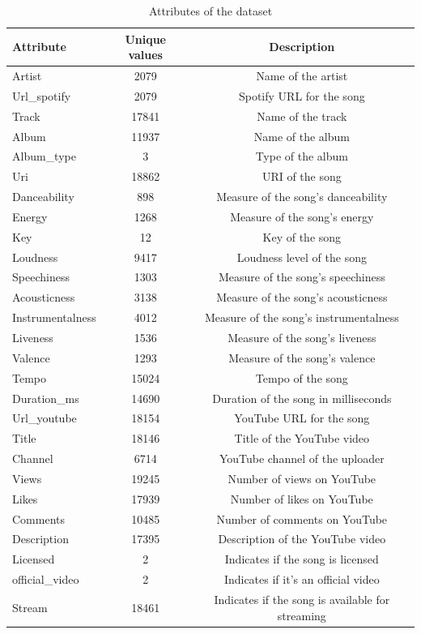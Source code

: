 \documentclass[11pt]{article} %
\begin{document}
\begin{table}[H]
	\centering
	\begin{tabular}{lcc}
		\toprule
		\textbf{Attribute} & \textbf{Unique values} & \textbf{Description} \\
		\midrule
		Artist & 2079 & Name of the artist \\
		Url\_spotify & 2079 & Spotify URL for the song \\
		Track & 17841 & Name of the track \\
		Album & 11937 & Name of the album \\
		Album\_type & 3 & Type of the album \\
		Uri & 18862 & URI of the song \\
		Danceability & 898 & Measure of the song's danceability \\
		Energy & 1268 & Measure of the song's energy \\
		Key & 12 & Key of the song \\
		Loudness & 9417 & Loudness level of the song \\
		Speechiness & 1303 & Measure of the song's speechiness \\
		Acousticness & 3138 & Measure of the song's acousticness \\
		Instrumentalness & 4012 & Measure of the song's instrumentalness \\
		Liveness & 1536 & Measure of the song's liveness \\
		Valence & 1293 & Measure of the song's valence \\
		Tempo & 15024 & Tempo of the song \\
		Duration\_ms & 14690 & Duration of the song in milliseconds \\
		Url\_youtube & 18154 & YouTube URL for the song \\
		Title & 18146 & Title of the YouTube video \\
		Channel & 6714 & YouTube channel of the uploader \\
		Views & 19245 & Number of views on YouTube \\
		Likes & 17939 & Number of likes on YouTube \\
		Comments & 10485 & Number of comments on YouTube \\
		Description & 17395 & Description of the YouTube video \\
		Licensed & 2 & Indicates if the song is licensed \\
		official\_video & 2 & Indicates if it's an official video \\
		Stream & 18461 & Indicates if the song is available for streaming \\
		\bottomrule
	\end{tabular}
	\caption{Attributes of the dataset}
	\label{tab:attributes}
\end{table}
\end{document}
